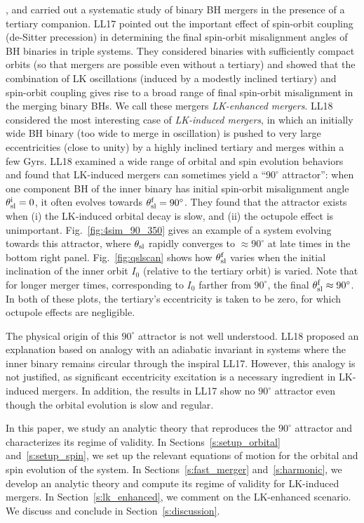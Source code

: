 \documentclass[
        twocolumn,
        twocolappendix
    ]{aastex63}
\begin{document}
\citet[][hereafter LL17, LL18]{bin1, bin2}, and \citet{bin3} carried out a
systematic study of binary BH mergers in the presence of a tertiary companion.
LL17 pointed out the important effect of spin-orbit coupling (de-Sitter
precession) in determining the final spin-orbit misalignment angles of BH
binaries in triple systems. They considered binaries with sufficiently compact
orbits (so that mergers are possible even without a tertiary) and showed that
the combination of LK oscillations (induced by a modestly inclined tertiary) and
spin-orbit coupling gives rise to a broad range of final spin-orbit misalignment
in the merging binary BHs. We call these mergers \emph{LK-enhanced mergers}.
LL18 considered the most interesting case of \emph{ LK-induced mergers}, in
which an initially wide BH binary (too wide to merge in oscillation) is pushed
to very large eccentricities (close to unity) by a highly inclined tertiary and
merges within a few Gyrs. LL18 examined a wide range of orbital and spin
evolution behaviors and found that LK-induced mergers can sometimes yield a
``$90^\circ$ attractor'': when one component BH of the inner binary has initial
spin-orbit misalignment angle $\theta_{\rm sl}^{\rm i} = 0$, it often evolves
towards $\theta_{\rm sl}^{\rm f} = 90^\circ$. They found that the attractor
exists when (i) the LK-induced orbital decay is slow, and (ii) the octupole
effect is unimportant. Fig.~\ref{fig:4sim_90_350} gives an example of a system
evolving towards this attractor, where $\theta_{\rm sl}$ rapidly converges to
$\approx 90^\circ$ at late times in the bottom right panel.
Fig.~\ref{fig:qslscan} shows how $\theta_{\rm sl}^{\rm f}$ varies when the
initial inclination of the inner orbit $I_0$ (relative to the tertiary orbit) is
varied. Note that for longer merger times, corresponding to $I_0$ farther from
$90^\circ$, the final $\theta_{\rm sl}^{\rm f} \approx 90^\circ$. In both of
these plots, the tertiary's eccentricity is taken to be zero, for which octupole
effects are negligible.

The physical origin of this $90^\circ$ attractor is not well understood.
LL18 proposed an explanation based on analogy with an adiabatic
invariant in systems where the inner binary remains circular through the
inspiral LL17. However, this analogy is not justified, as significant
eccentricity excitation is a necessary ingredient in LK-induced mergers. In
addition, the results in LL17 show no $90^\circ$ attractor even though
the orbital evolution is slow and regular.

In this paper, we study an analytic theory that reproduces the $90^\circ$
attractor and characterizes its regime of validity. In
Sections~\ref{s:setup_orbital} and~\ref{s:setup_spin}, we set up the relevant
equations of motion for the orbital and spin evolution of the system. In
Sections~\ref{s:fast_merger} and~\ref{s:harmonic}, we develop an analytic theory
and compute its regime of validity for LK-induced mergers. In
Section~\ref{s:lk_enhanced}, we comment on the LK-enhanced scenario. We discuss
and conclude in Section~\ref{s:discussion}.
\end{document}

